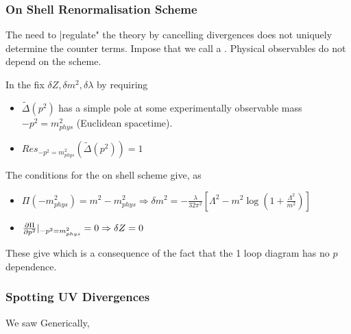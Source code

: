 \documentclass{article}
\begin{document}
\subsubsection*{On Shell Renormalisation Scheme}
The need to |regulate" the theory by cancelling divergences does not uniquely determine the counter terms. Impose  that we call a . Physical observables do not depend on the scheme. 

\begin{definition}
In the  fix $\delta Z, \delta m^2 , \delta \lambda$ by requiring 
\begin{itemize}
    \item $\tilde{\Delta}(p^2)$ has a simple pole at some experimentally observable mass $-p^2 = m_{phys}^2$ (Euclidean spacetime). 
    \item $Res_{-p^2 = m_{phys}^2} (\tilde{\Delta}(p^2)) = 1$
\end{itemize}
\end{definition}
The conditions for the on shell scheme give, as 
\begin{itemize}
    \item $\Pi(-m_{phys}^2) = m^2 - m_{phys}^2 \Rightarrow \delta m^2 = -\frac{\lambda}{32\pi^2} \left[ \Lambda^2 - m^2 \log \left( 1 + \frac{\Lambda^2}{m^2}\right) \right]$ 
    \item $\pd[\Pi]{p^2}|_{-p^2 = m_{phys}^2} = 0 \Rightarrow \delta Z = 0$
\end{itemize}
These give 
which is a consequence of the fact that the 1 loop diagram has no $p$ dependence. 

\subsubsection*{Spotting UV Divergences}
We saw 
Generically, 
\end{document}
